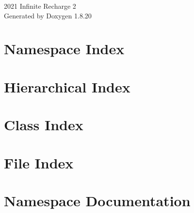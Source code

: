 \let\mypdfximage\pdfximage\def\pdfximage{\immediate\mypdfximage}\documentclass[twoside]{book}
\newcommand{\+}{\discretionary{\mbox{\scriptsize$\hookleftarrow$}}{}{}}
\newcommand{\clearemptydoublepage}{%
  \newpage{\pagestyle{empty}\cleardoublepage}%
}
\begin{document}
\hypersetup{pageanchor=false,
             bookmarksnumbered=true,
             pdfencoding=unicode
            }
\begin{titlepage}
\vspace*{7cm}
\begin{center}%
{\Large 2021 Infinite Recharge 2 }\\
\vspace*{1cm}
{\large Generated by Doxygen 1.8.20}\\
\end{center}
\end{titlepage}
\clearemptydoublepage
{}
\tableofcontents
\clearemptydoublepage
{}
\hypersetup{pageanchor=true}

\chapter{Namespace Index}

\chapter{Hierarchical Index}

\chapter{Class Index}

\chapter{File Index}

\chapter{Namespace Documentation}






\end{document}
